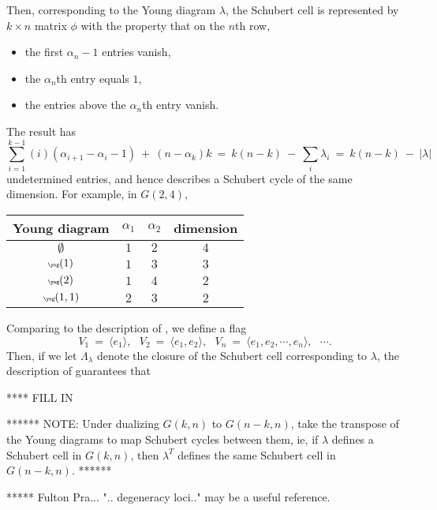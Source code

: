 \documentclass[12pt]{article}
\begin{document}
Then, corresponding to the Young diagram $\lambda$, the Schubert cell
is represented by $k \times n$ matrix $\phi$ with the property that on
the $n$th row,
\begin{itemize}
\item the first $\alpha_n-1$ entries vanish,
\item the $\alpha_n$th entry equals $1$,
\item the entries above the $\alpha_n$th entry vanish.
\end{itemize}

The result has 
\begin{equation}
\sum_{i=1}^{k-1} (i) \left( \alpha_{i+1} - \alpha_i - 1 \right) \: + \:
(n - \alpha_k) k \: = \: k(n-k) \: - \: \sum_i \lambda_i 
\: = \: k (n-k) \: - \: | \lambda |
\end{equation}
undetermined entries, and hence describes a Schubert cycle of the same
dimension.  For example, in $G(2,4)$,
\begin{center}
\begin{tabular}{c|cc|c} 
Young diagram & $\alpha_1$ & $\alpha_2$ & dimension \\ \hline
$\emptyset$ & $1$ & $2$ & $4$ \\
$\tiny\yng(1)$ & $1$ & $3$ & $3$ \\
$\tiny\yng(2)$ & $1$ & $4$ & $2$ \\
$\tiny\yng(1,1)$ & $2$ & $3$ & $2$
\end{tabular}
\end{center}

Comparing to the description of \cite{gh}, we define a flag
\begin{equation}
V_1 \: = \: \langle e_1 \rangle, \: \: \:
V_2 \: = \: \langle e_1, e_2 \rangle, \: \: \:
V_n \: = \: \langle e_1, e_2, \cdots, e_n \rangle, \: \: \:
\cdots.
\end{equation}
Then, if we let $\Lambda_{\lambda}$ denote the closure of the Schubert
cell corresponding to $\lambda$, the description of \cite{Closset:2023bdr}
guarantees that 

**** FILL IN



****** NOTE:  Under dualizing $G(k,n)$ to $G(n-k,n)$,
take the transpose of the Young diagrams to map Schubert cycles between
them, ie, if $\lambda$ defines a Schubert cell in $G(k,n)$,
then $\lambda^T$ defines the same Schubert cell in $G(n-k,n)$.
******

***** Fulton Pra... ".. degeneracy loci.." may be a useful reference.
\end{document}
